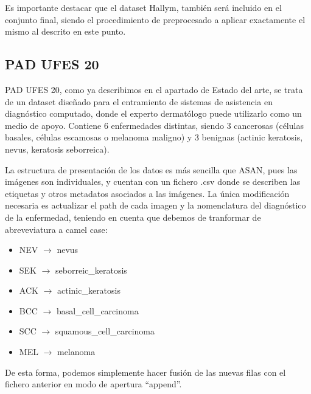 Es importante destacar que el dataset Hallym, también será incluido en el conjunto final, siendo el procedimiento de preprocesado a aplicar exactamente el mismo al descrito en este punto.

\subsection{PAD UFES 20}

PAD UFES 20, como ya describimos en el apartado de Estado del arte, se trata de un dataset diseñado para el entramiento de sistemas de asistencia en diagnóstico computado, donde el experto dermatólogo puede utilizarlo como un medio de apoyo. Contiene 6 enfermedades distintas, siendo 3 cancerosas (células basales, células escamosas o melanoma maligno) y 3 benignas (actinic keratosis, nevus, keratosis seborreica).

La estructura de presentación de los datos es más sencilla que ASAN, pues las imágenes son individuales, y cuentan con un fichero .csv donde se describen las etiquetas y otros metadatos asociados a las imágenes. La única modificación necesaria es actualizar el path de cada imagen y la nomenclatura del diagnóstico de la enfermedad, teniendo en cuenta que debemos de tranformar de abreveviatura a camel case:
\begin{itemize}
	\item NEV $\rightarrow$ nevus
	\item SEK  $\rightarrow$ seborreic\_keratosis 
	\item ACK $\rightarrow$ actinic\_keratosis  
	\item BCC $\rightarrow$  basal\_cell\_carcinoma           
	\item SCC $\rightarrow$ squamous\_cell\_carcinoma
	\item MEL $\rightarrow$ melanoma
	         
\end{itemize}

De esta forma, podemos simplemente hacer fusión de las nuevas filas con el fichero anterior en modo de apertura ``append''.

